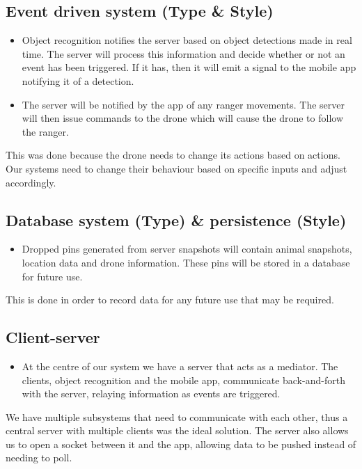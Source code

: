 \documentclass[a4paper,11pt]{book}
\begin{document}
\subsection{Event driven system (Type \& Style)}

\begin{itemize}
	\item Object recognition notifies the server based on object detections made in real time. 
	The server will process this information and decide whether or not an event has been triggered. 
	If it has, then it will emit a signal to the mobile app notifying it of a detection.

	\item The server will be notified by the app of any ranger movements. The server will then issue 
	commands to the drone which will cause the drone to follow the ranger.
\end{itemize}
This was done because the drone needs to change its actions based on actions. Our systems need to change their behaviour
based on specific inputs and adjust accordingly.

\subsection{Database system (Type) \& persistence (Style)}

\begin{itemize}
	\item Dropped pins generated from server snapshots will contain animal snapshots, location data and drone information. 
	These pins will be stored in a database for future use.
\end{itemize}
This is done in order to record data for any future use that may be required.

\subsection{Client-server}

\begin{itemize}
	\item At the centre of our system we have a server that acts as a mediator. The clients, object recognition and the mobile app, 
	communicate back-and-forth with the server, relaying information as events are triggered.
\end{itemize}
We have multiple subsystems that need to communicate with each other, thus a central server with multiple clients was the ideal solution.
The server also allows us to open a socket between it and the app, allowing data to be pushed instead of needing to poll.
\end{document}
